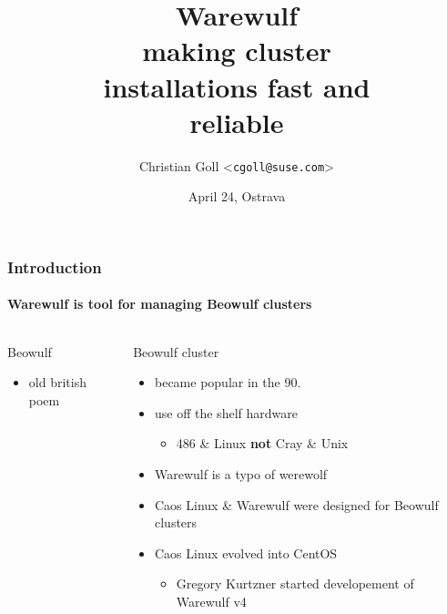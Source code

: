 \documentclass[aspectratio=169]{beamer}
\title{Warewulf\\
making cluster\\
installations fast and \\
reliable}
\date{April 24, Ostrava}
\author{Christian Goll <\texttt{cgoll@suse.com}>}
\begin{document}
\begin{frame}
\titlepage
\end{frame}
\begin{frame}[fragile]
\frametitle{Introduction}
\framesubtitle{Warewulf is tool for managing Beowulf clusters}
\begin{columns}
\begin{block}{Beowulf}
  \begin{itemize}
    \item old british poem
  \end{itemize}
\end{block}
\begin{block}{Beowulf cluster}
  \begin{itemize}
    \item became popular in the 90.
    \item use off the shelf hardware
    \begin{itemize}
      \item 486 \& Linux \textbf{not} Cray \& Unix
    \end{itemize}
    \item Warewulf is a typo of werewolf
    \item Caos Linux \& Warewulf were designed for Beowulf clusters
    \item Caos Linux evolved into CentOS
    \begin{itemize}
      \item Gregory Kurtzner started developement of Warewulf v4
    \end{itemize}
  \end{itemize}
\end{block}

\end{columns}
\end{frame}
\end{document}
